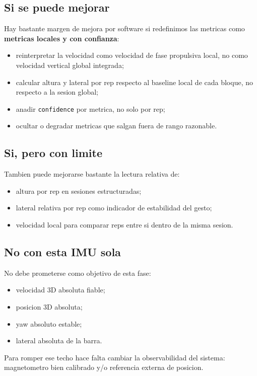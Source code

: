\documentclass[11pt,a4paper]{article}
\begin{document}
\subsection*{Si se puede mejorar}
Hay bastante margen de mejora por software si redefinimos las metricas como \textbf{metricas locales y con confianza}:
\begin{itemize}[leftmargin=14pt]
  \item reinterpretar la velocidad como velocidad de fase propulsiva local, no como velocidad vertical global integrada;
  \item calcular altura y lateral por rep respecto al baseline local de cada bloque, no respecto a la sesion global;
  \item anadir \texttt{confidence} por metrica, no solo por rep;
  \item ocultar o degradar metricas que salgan fuera de rango razonable.
\end{itemize}

\subsection*{Si, pero con limite}
Tambien puede mejorarse bastante la lectura relativa de:
\begin{itemize}[leftmargin=14pt]
  \item altura por rep en sesiones estructuradas;
  \item lateral relativa por rep como indicador de estabilidad del gesto;
  \item velocidad local para comparar reps entre si dentro de la misma sesion.
\end{itemize}

\subsection*{No con esta IMU sola}
No debe prometerse como objetivo de esta fase:
\begin{itemize}[leftmargin=14pt]
  \item velocidad 3D absoluta fiable;
  \item posicion 3D absoluta;
  \item yaw absoluto estable;
  \item lateral absoluta de la barra.
\end{itemize}

Para romper ese techo hace falta cambiar la observabilidad del sistema: magnetometro bien calibrado y/o referencia externa de posicion.
\end{document}
